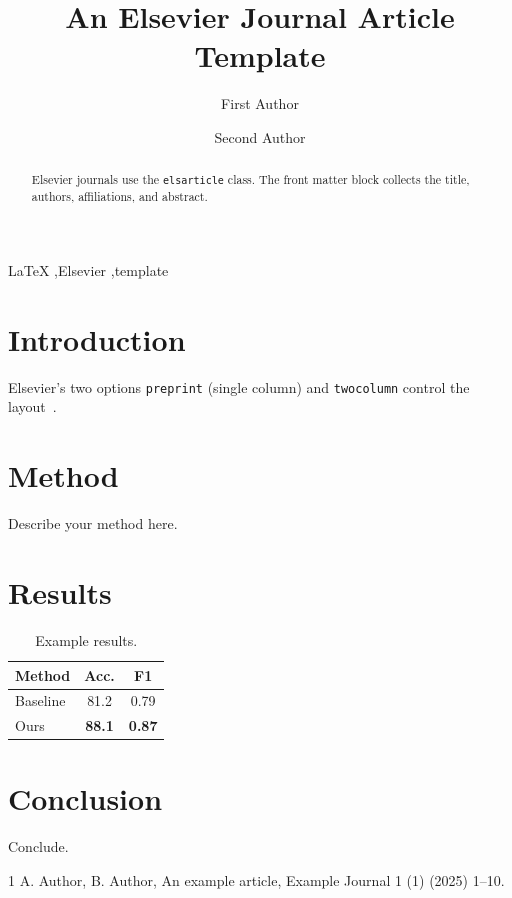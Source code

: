 \documentclass[preprint,12pt]{elsarticle}
\begin{document}
\begin{frontmatter}

\title{An Elsevier Journal Article Template}

\author[inst1]{First Author}

\author[inst2]{Second Author}

\begin{abstract}
Elsevier journals use the \texttt{elsarticle} class. The front matter
block collects the title, authors, affiliations, and abstract.
\end{abstract}

\begin{keyword}
LaTeX \sep Elsevier \sep template
\end{keyword}

\end{frontmatter}

\section{Introduction}
Elsevier's two options \texttt{preprint} (single column) and
\texttt{twocolumn} control the layout~\cite{els_demo}.

\section{Method}
Describe your method here.

\section{Results}
\begin{table}[h]
  \centering
  \caption{Example results.}
  \begin{tabular}{lcc}
    \toprule
    Method & Acc. & F1 \\
    \midrule
    Baseline & 81.2 & 0.79 \\
    Ours     & \textbf{88.1} & \textbf{0.87} \\
    \bottomrule
  \end{tabular}
\end{table}

\section{Conclusion}
Conclude.


\begin{thebibliography}{1}
A. Author, B. Author, An example article, Example Journal 1 (1) (2025) 1--10.
\end{thebibliography}
\end{document}
